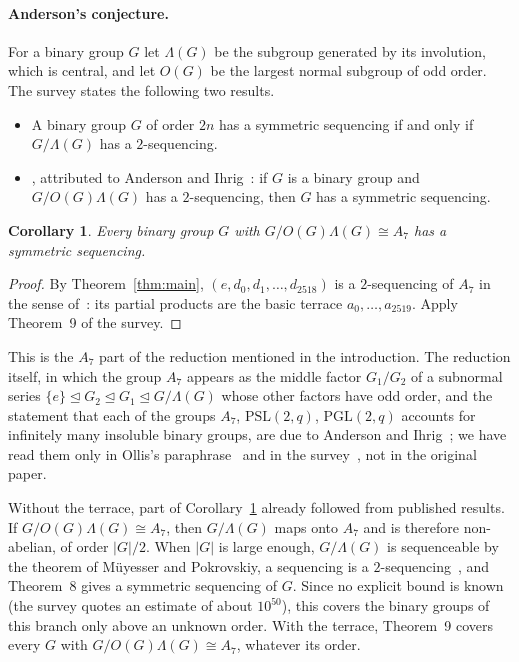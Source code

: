 \documentclass[11pt]{article}
\newtheorem{corollary}{Corollary}
\theoremstyle{definition}
\theoremstyle{remark}
\newcommand{\Alt}{A_7}
\begin{document}
\paragraph{Anderson's conjecture.}
For a binary group $G$ let $\Lambda(G)$ be the subgroup generated by its
involution, which is central, and let $O(G)$ be the largest normal subgroup of
odd order. The survey states the following two results.

\begin{itemize}
\item \cite[Theorem~8]{survey} A binary group $G$ of order $2n$ has a symmetric
sequencing if and only if $G/\Lambda(G)$ has a $2$-sequencing.
\item \cite[Theorem~9]{survey}, attributed to Anderson and Ihrig~\cite{ai93a}:
if $G$ is a binary group and $G/O(G)\Lambda(G)$ has a $2$-sequencing, then $G$
has a symmetric sequencing.
\end{itemize}

\begin{corollary}\label{cor:anderson}
Every binary group $G$ with $G/O(G)\Lambda(G)\cong\Alt$ has a symmetric
sequencing.
\end{corollary}

\begin{proof}
By Theorem~\ref{thm:main}, $(e,d_0,d_1,\dots,d_{2518})$ is a $2$-sequencing of
$\Alt$ in the sense of~\cite[p.~14]{survey}: its partial products are the basic
terrace $a_0,\dots,a_{2519}$. Apply Theorem~9 of the survey.
\end{proof}

\noindent This is the $A_7$ part of the reduction mentioned in the
introduction. The reduction itself, in which the group $\Alt$ appears as the
middle factor $G_1/G_2$ of a subnormal series $\{e\}\trianglelefteq
G_2\trianglelefteq G_1\trianglelefteq G/\Lambda(G)$ whose other factors have odd
order, and the statement that each of the groups $\Alt$, $\mathrm{PSL}(2,q)$,
$\mathrm{PGL}(2,q)$ accounts for infinitely many insoluble binary groups, are
due to Anderson and Ihrig~\cite{ai93b}; we have read them only in Ollis's
paraphrase~\cite[Section~3]{ollis16} and in the survey~\cite[p.~15]{survey},
not in the original paper.

Without the terrace, part of Corollary~\ref{cor:anderson} already followed
from published results. If $G/O(G)\Lambda(G)\cong\Alt$, then $G/\Lambda(G)$
maps onto $\Alt$ and is therefore non-abelian, of order $|G|/2$. When $|G|$ is
large enough, $G/\Lambda(G)$ is sequenceable by the theorem of Müyesser and
Pokrovskiy, a sequencing is a $2$-sequencing~\cite[p.~14]{survey}, and
Theorem~8 gives a symmetric sequencing of $G$. Since no explicit bound is
known (the survey quotes an estimate of about $10^{50}$), this covers the
binary groups of this branch only above an unknown order. With the terrace,
Theorem~9 covers every $G$ with $G/O(G)\Lambda(G)\cong\Alt$, whatever its
order.
\end{document}
